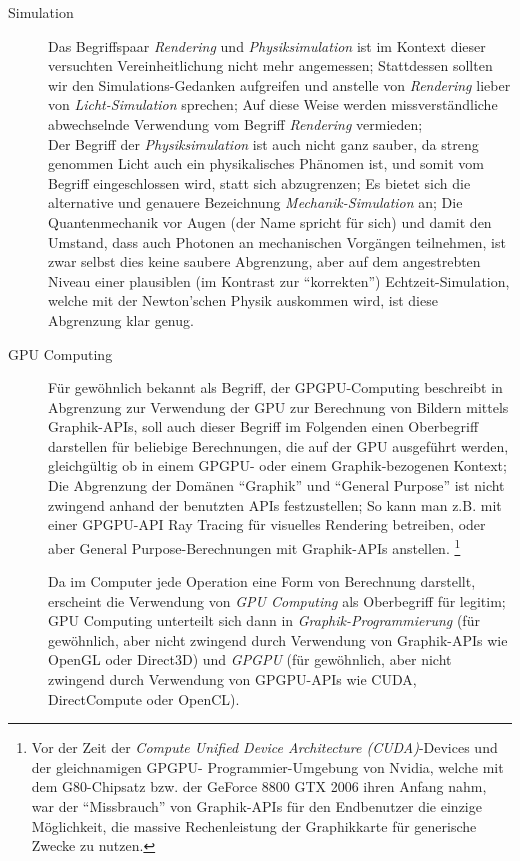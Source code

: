 \begin{description}
	\item[Simulation] Das Begriffspaar \emph{Rendering} und \emph{Physiksimulation} ist im Kontext dieser versuchten 
	Vereinheitlichung nicht mehr angemessen; Stattdessen sollten wir den Simulations-Gedanken aufgreifen und anstelle von
	\emph{Rendering} lieber von \emph{Licht-Simulation} sprechen; Auf diese Weise werden missverständliche abwechselnde 
	Verwendung vom Begriff \emph{Rendering} vermieden;\\
	Der Begriff der \emph{Physiksimulation} ist auch nicht ganz sauber, da streng genommen Licht auch ein physikalisches
	Phänomen ist, und somit vom Begriff eingeschlossen wird, statt sich abzugrenzen; Es bietet sich die alternative und 
	genauere  Bezeichnung \emph{Mechanik-Simulation} an; Die Quantenmechanik vor Augen (der Name spricht für sich) und 
	damit den Umstand, dass auch Photonen an mechanischen Vorgängen teilnehmen, ist zwar selbst dies keine saubere 	
	Abgrenzung, aber auf dem angestrebten Niveau einer plausiblen (im Kontrast zur "`korrekten"') Echtzeit-Simulation, 
	welche mit der Newton'schen Physik auskommen wird, ist diese Abgrenzung klar genug.
	
	\item[GPU Computing]
	Für gewöhnlich bekannt als Begriff, der GPGPU-Computing beschreibt in Abgrenzung zur Verwendung der GPU zur Berechnung 
	von	Bildern mittels Graphik-APIs, soll auch dieser Begriff im Folgenden einen Oberbegriff darstellen für beliebige
	Berechnungen, die auf der GPU ausgeführt werden, gleichgültig ob in einem GPGPU- oder einem Graphik-bezogenen Kontext;
	Die Abgrenzung der Domänen "`Graphik"' und "`General Purpose"' ist nicht zwingend anhand der benutzten APIs 
	festzustellen; So kann man z.B. mit einer GPGPU-API Ray Tracing für visuelles Rendering betreiben, oder aber 
	General Purpose-Berechnungen mit Graphik-APIs anstellen.
	\footnote{Vor der Zeit der \emph{Compute Unified Device Architecture (CUDA)}-Devices und der gleichnamigen GPGPU-
	Programmier-Umgebung von Nvidia, welche mit dem G80-Chipsatz bzw. der GeForce 8800 GTX 2006 ihren Anfang nahm, war
	der "`Missbrauch"' von Graphik-APIs für den Endbenutzer die einzige Möglichkeit, die massive Rechenleistung der
	Graphikkarte für generische Zwecke zu nutzen.}
	
	Da im Computer jede Operation eine Form von Berechnung darstellt, erscheint die Verwendung von \emph{GPU Computing}
	als Oberbegriff für legitim; GPU Computing unterteilt sich dann in \emph{Graphik-Programmierung} (für gewöhnlich, aber 
	nicht zwingend durch Verwendung von Graphik-APIs wie OpenGL oder Direct3D) und \emph{GPGPU} (für gewöhnlich, aber 
	nicht zwingend durch Verwendung von GPGPU-APIs wie CUDA, DirectCompute oder OpenCL).
		

	
\end{description}


